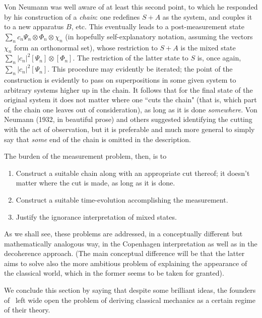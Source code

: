 \documentclass[12pt,titlepage]{article}
\newcommand{\ot}{\otimes}
\newcommand{\ch}{\chi} \newcommand{\ps}{\psi} \newcommand{\Ps}{\Psi}
\begin{document}
Von Neumann was well aware of at least this second point, to which he responded by his construction of a {\it chain}: one redefines $S+A$ as the system, and couples it to a new apparatus $B$, etc. This eventually leads to a post-measurement state $\sum_n c_n \Psi_n \ot\Phi_n\ot \ch_n$ (in hopefully self-explanatory notation, assuming the vectors $\ch_n$ form an orthonormal set), whose restriction to $S+A$ is the mixed
state  $\sum_n |c_n|^2 [\Psi_n]\ot [\Phi_n]$.
The restriction of the latter state to $S$ is, once again, $\sum_n |c_n|^2  [\Psi_n]$. This procedure may evidently be iterated; the point of the construction is evidently to pass on superpositions in some given system to arbitrary systems higher up in the chain.
It follows that for the final state of the original system it does not matter where one ``cuts the chain" (that is, which part of  the chain one leaves out of consideration), as long as it is done {\it somewhere}. Von Neumann (1932, in beautiful prose) and others suggested identifying the cutting with the act of observation, but it is preferable and much more general to  simply say that {\it some} end of the chain is omitted in the description. 

The burden of the  measurement problem, then, is to \begin{enumerate}
\item Construct a suitable chain along with an appropriate cut thereof;  it doesn't matter where the cut is made, as long as it is done.
\item Construct a suitable time-evolution accomplishing the measurement.
 \item Justify the  ignorance interpretation of mixed states. 
\end{enumerate}
As we shall see, these problems are addressed, in a conceptually different but mathematically analogous way, in the 
Copenhagen interpretation as well as in the decoherence approach.
(The main conceptual difference will be that the latter aims to solve also the more ambitious problem of explaining the appearance of the classical world, which in the former seems to be taken for granted). 
\bigskip

We conclude this section by saying that despite some brilliant ideas, the founders of \qm\ left  wide open the problem of deriving classical mechanics as a certain regime of their theory. 
\end{document}
